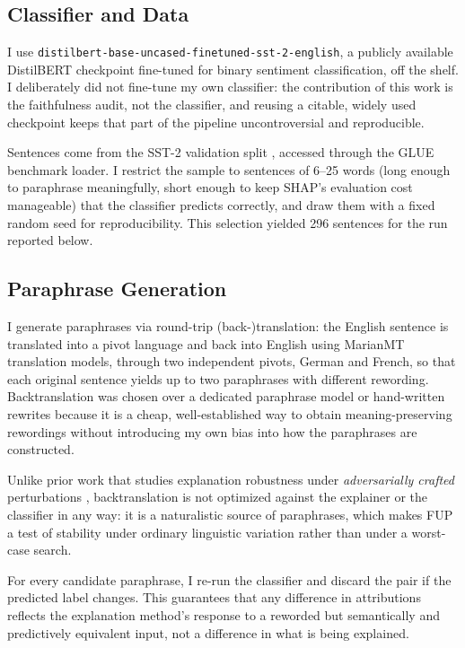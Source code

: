 \subsection{Classifier and Data}

I use \texttt{distilbert-base-uncased-finetuned-sst-2-english}, a
publicly available DistilBERT checkpoint \citep{sanh2019distilbert}
fine-tuned for binary sentiment classification, off the shelf. I
deliberately did not fine-tune my own classifier: the contribution of
this work is the faithfulness audit, not the classifier, and reusing a
citable, widely used checkpoint keeps that part of the pipeline
uncontroversial and reproducible.

Sentences come from the SST-2 validation split \citep{socher2013recursive},
accessed through the GLUE benchmark loader. I restrict the sample to
sentences of 6--25 words (long enough to paraphrase meaningfully, short
enough to keep SHAP's evaluation cost manageable) that the classifier
predicts correctly, and draw them with a fixed random seed for
reproducibility. This selection yielded 296 sentences for the run
reported below.

\subsection{Paraphrase Generation}

I generate paraphrases via round-trip (back-)translation: the English
sentence is translated into a pivot language and back into English using
MarianMT translation models, through two independent pivots, German and
French, so that each original sentence yields up to two paraphrases with
different rewording. Backtranslation was chosen over a dedicated
paraphrase model or hand-written rewrites because it is a cheap,
well-established way to obtain meaning-preserving rewordings without
introducing my own bias into how the paraphrases are constructed.

Unlike prior work that studies explanation robustness under
\emph{adversarially crafted} perturbations
\citep{ivankay2022fooling,ivankay2022estimating,slack2020fooling},
backtranslation is not optimized against the explainer or the
classifier in any way: it is a naturalistic source of paraphrases, which
makes FUP a test of stability under ordinary linguistic variation rather
than under a worst-case search.

For every candidate paraphrase, I re-run the classifier and discard the
pair if the predicted label changes. This guarantees that any difference
in attributions reflects the explanation method's response to a
reworded but semantically and predictively equivalent input, not a
difference in what is being explained.

